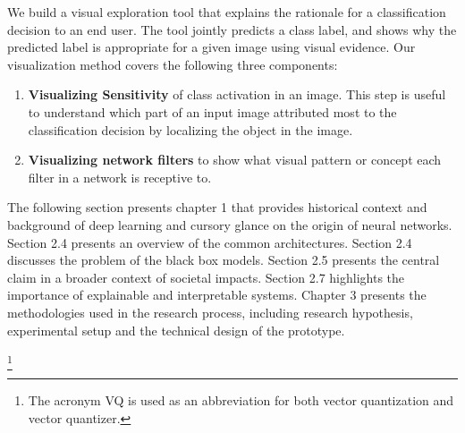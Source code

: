 We build a visual exploration tool that explains the rationale for a classification decision to an end user. The tool jointly predicts a class label,  and shows why the predicted label is appropriate for a given image using visual evidence. Our visualization method covers the following three components:

\begin{itemize}
\begin{enumerate}
\item \textbf{Visualizing  Sensitivity} of class activation in an image. This step is useful to understand which part of an input image attributed most to the classification decision by localizing the object in the image.

\item \textbf{Visualizing network filters} to show what visual pattern or concept each filter in a network is receptive to.

\iffalse
\item  \textbf{Visualizing intermediate outputs}: It helps a user understands how successive layers transform their input, and to get an insight into the individual network filters.
\fi

\end{enumerate}
\end{itemize}

The following section presents chapter 1 that provides historical context and background of deep learning and cursory glance on the origin of neural networks.  Section 2.4 presents an overview of the common architectures.  Section 2.4 discusses the problem of the black box models.  Section 2.5 presents the central claim in a broader context of societal impacts.  Section 2.7 highlights the importance of explainable and interpretable systems.  Chapter 3 presents the methodologies used in the research process, including research hypothesis, experimental setup and the technical design of the prototype.

\footnote{The acronym VQ is used as an abbreviation for both vector quantization and vector
  quantizer.}
  



